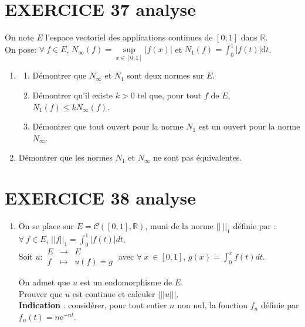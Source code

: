 \documentclass[10pt,oneside]{article}
\begin{document}
\begin{flushleft}
\section*{EXERCICE 37 \:analyse }

On note $E$ l'espace vectoriel des applications continues de $[0;1]$ dans $\mathbb{R}$.\\
 On pose: $\forall \:f\in E$,
$N_{\infty}(f)=\sup\limits_{x\in[0;1]} |f(x)|$ et $N_1(f)=\displaystyle\int_0^1|f(t)| \text{d}t$.


\begin{enumerate}
\item \begin{enumerate}
\item Démontrer que $N_{\infty}$ et $N_1$ sont deux normes sur $E$.
\item Démontrer qu'il existe $k>0$ tel que, pour tout $f$ de $E$, $N_1(f)\leq k N_{\infty}(f)$.
\item Démontrer que tout ouvert pour la norme $N_1$ est un ouvert pour la norme $N_{\infty}$.
\end{enumerate}
\item Démontrer que les normes $N_1$ et $N_{\infty}$ ne sont pas équivalentes.
\end{enumerate}

\section*{EXERCICE 38 \:analyse }


\begin{enumerate}
\item

On se place sur  $E=\mathcal{C} \left( [0,1],\mathbb{R}\right) $, muni de la norme $||\:||_1$ définie par  : $\forall\:f\in E$, $||f||_1=\displaystyle\int_{0}^{1}|f(t)|dt$.\\
Soit $u:\begin{array}{lll}
E &\longrightarrow &E\\
f&\longmapsto & u(f)=g
\end{array}$
 avec $\forall\: x\:\in [0,1]$, $g(x)=\displaystyle\int_{0}^{x}f(t)dt$.\\
 \medskip

On admet que $u$ est un endomorphisme de $E$.\\

Prouver que $u$ est continue et calculer $|||u|||$.\\
\textbf{Indication} : considérer, pour tout entier $n$ non nul, la fonction $f_n$ définie par  $f_n(t)=n\mathrm{e}^{-nt}$.


\end{enumerate}
\end{flushleft}
\end{document}

